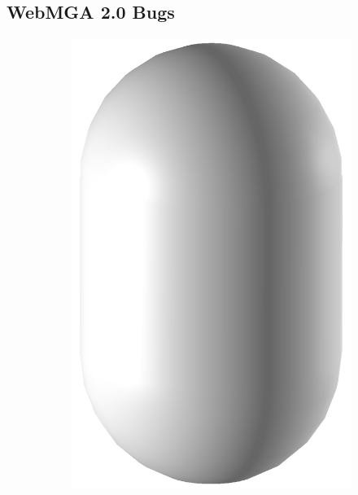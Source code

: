 \subsection{WebMGA 2.0 Bugs}
\begin{figure}
  \begin{center}
    \begin{subfigure}{0.2\textwidth}
    \includegraphics[width=\linewidth]{assets/images/shapes/bugold/bad_mesh_high}
    \caption{}
    \end{subfigure}
      \begin{subfigure}{0.2\textwidth}

\end{subfigure}
\end{center}
\end{figure}

